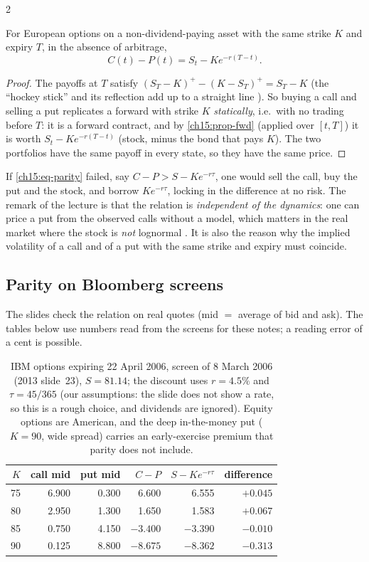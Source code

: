 \begin{paracol}{2}
\begin{theorem}\label{ch15:thm-parity}
For European options on a non-dividend-paying asset with the same strike $K$ and expiry $T$, in the absence of arbitrage,
\begin{equation}\label{ch15:eq-parity}
  C(t)-P(t)=S_t-Ke^{-r(T-t)}.
\end{equation}
\end{theorem}
\begin{proof}
The payoffs at $T$ satisfy $(S_T-K)^+-(K-S_T)^+=S_T-K$ (the ``hockey stick'' and its reflection add up to a straight line ). So buying a call and selling a put
replicates a forward with strike $K$ \emph{statically}, i.e.\ with no trading before $T$: it is a forward contract, and by
\cref{ch15:prop-fwd} (applied over $[t,T]$) it is worth $S_t-Ke^{-r(T-t)}$ (stock, minus the bond that pays $K$). The two portfolios have the same payoff in every state, so they have the same price. 
\end{proof}
If \eqref{ch15:eq-parity} failed, say $C-P>S-Ke^{-r\tau}$, one would sell the call, buy the put and the stock, and borrow $Ke^{-r\tau}$, locking in the difference at no risk. The remark of the lecture is that the relation is
\emph{independent of the dynamics}: one can price a put from the observed calls without a model, which matters in the real market where the stock is \emph{not} lognormal
. It is also the reason why the implied volatility of a call and of a put with the same strike and expiry must coincide.

\subsection{Parity on Bloomberg screens}
The slides check the relation on real quotes (mid $=$ average of bid and ask). The tables below use numbers read from the screens for these notes; a reading error of a cent is possible.
\begin{table}[ht]
\centering\small
\begin{tabular}{r r r r r r}
\toprule
$K$ & call mid & put mid & $C-P$ & $S-Ke^{-r\tau}$ & difference\\
\midrule
75 & 6.900 & 0.300 & 6.600 & 6.555 & $+0.045$\\
80 & 2.950 & 1.300 & 1.650 & 1.583 & $+0.067$\\
85 & 0.750 & 4.150 & $-3.400$ & $-3.390$ & $-0.010$\\
90 & 0.125 & 8.800 & $-8.675$ & $-8.362$ & $-0.313$\\
\bottomrule
\end{tabular}
\caption{IBM options expiring 22 April 2006, screen of 8 March 2006 (2013 slide~23), $S=81.14$; the discount uses $r=4.5\%$ and $\tau=45/365$ (our assumptions: the slide does not
show a rate, so this is a rough choice, and dividends are ignored). Equity options are American, and the deep in-the-money put ($K=90$, wide spread) carries an early-exercise premium that parity does not include.}\label{ch15:tab-ibm}
\end{table}


\end{paracol}
